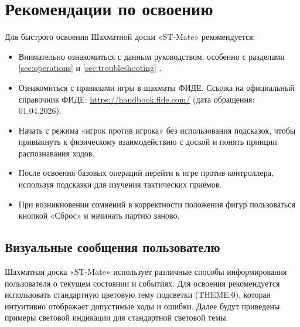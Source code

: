\documentclass[a4paper,12pt]{article}
\begin{document}
\section{Рекомендации по освоению}
\label{sec:usage}
Для быстрого освоения Шахматной доски «ST-Mate» рекомендуется:
\begin{itemize}
    \item Внимательно ознакомиться с данным руководством, особенно с разделами \ref{sec:operations}  и \ref{sec:troubleshooting} .
    \item Ознакомиться с правилами игры в шахматы ФИДЕ. Ссылка на официальный справочник ФИДЕ: \url{https://handbook.fide.com/} (дата обращения: 01.04.2026).
    \item Начать с режима «игрок против игрока» без использования подсказок, чтобы привыкнуть к физическому взаимодействию с доской и понять принцип распознавания ходов.
    \item После освоения базовых операций перейти к игре против контроллера, используя подсказки для изучения тактических приёмов.
    \item При возникновении сомнений в корректности положения фигур пользоваться кнопкой «Сброс» и начинать партию заново.
\end{itemize}

\subsection{Визуальные сообщения пользователю}

Шахматная доска «ST-Mate» использует различные способы информирования пользователя о текущем состоянии и событиях.
Для освоения рекомендуется использовать стандартную цветовую тему подсветки (THEME:0), которая интуитивно отображает допустимые ходы и ошибки.
Далее будут приведены примеры световой индикации для стандартной световой темы.
\end{document}
